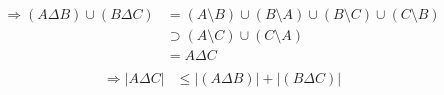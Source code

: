 \documentclass[10pt,a4paper,boxed]{hmcpset}
\begin{document}
\begin{solution}
\begin{enumerate}[(i)]
\begin{description}
\begin{align*}
								\Rightarrow (A \Delta B) \cup (B \Delta C) &= (A \setminus B) \cup (B \setminus A) \cup (B \setminus C ) \cup (C \setminus B)  \\
								&\supset (A \setminus C) \cup (C \setminus A)  \\
								&=  A \Delta C  \\
							\end{align*}
							\begin{align*}
								\Rightarrow  \left\vert A \Delta C \right\vert &\leq \left\vert (A \Delta B) \right\vert + \left\vert (B \Delta C) \right\vert
							\end{align*}
					\end{description}
			\end{enumerate}
		\end{solution}

	
\end{document}
